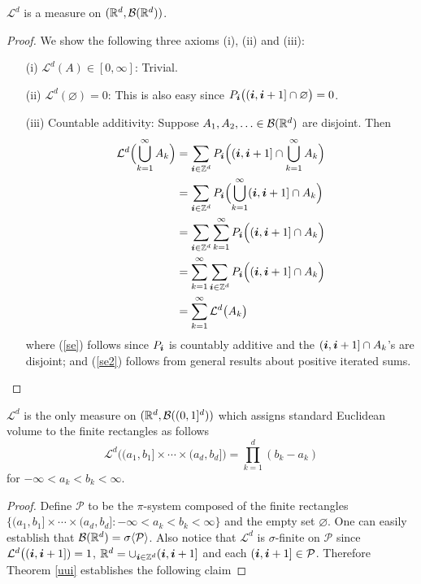 \begin{theorem}
 $\mathcal L^d$  is a measure on $(\Bbb R^d,\mathcal B(\Bbb R^d))$.
\end{theorem}
\begin{proof}
We show the following three axioms (i), (ii) and (iii):
\begin{enumerate}
\item[(i)] $\mathcal L^d(A)\in [0,\infty]$: Trivial.
 \item[(ii)]  $\mathcal L^d(\varnothing)=0$: This is also easy since $P_{\boldsymbol i}\bigl( (\boldsymbol i, \boldsymbol i+1]\cap \varnothing\bigr)=0$.
\item[(iii)] Countable additivity: Suppose $A_1,A_2,\ldots\in\mathcal B(\Bbb R^d)$ are disjoint. Then
\begin{align}
\mathcal L^d\Bigl (\bigcup_{k=1}^\infty A_k\Bigr)&=\sum_{\boldsymbol i\in\Bbb Z^d} P_{\boldsymbol i}\Bigl((\boldsymbol i, \boldsymbol i+1] \cap \bigcup_{k=1}^\infty A_k \Bigr) \nonumber\\
&=\sum_{\boldsymbol i\in\Bbb Z^d} P_{\boldsymbol i}\Bigl( \bigcup_{k=1}^\infty (\boldsymbol i, \boldsymbol i+1] \cap A_k \Bigr) \nonumber\\
&=\sum_{\boldsymbol i\in\Bbb Z^d} \sum_{k=1}^\infty P_{\boldsymbol i} \Bigl((\boldsymbol i, \boldsymbol i+1] \cap A_k \Bigr)\label{se} \\
&=\sum_{k=1}^\infty  \sum_{\boldsymbol i\in\Bbb Z^d} P_{\boldsymbol i} \Bigl((\boldsymbol i, \boldsymbol i+1] \cap A_k \Bigr)\label{se2} \\
&=\sum_{k=1}^\infty  \mathcal L^d\bigl (A_k \bigr) \nonumber
\end{align}
where (\ref{se}) follows since $P_{\boldsymbol i}$ is countably additive and the $ (\boldsymbol i, \boldsymbol i+1]\cap A_k $'s are disjoint; and (\ref{se2}) follows from general results about positive iterated sums.
\end{enumerate}
\end{proof}



 \begin{theorem}
 \label{ui2}
  $\mathcal L^d$ is the only measure on $(\Bbb R^d,\mathcal B((0,1]^d))$ which assigns standard Euclidean volume to the finite rectangles as follows
 \begin{equation}
\mathcal L^d \bigl( (a_1,b_1]\times \cdots \times (a_d,b_d]\bigr)=\prod_{k=1}^d (b_k - a_k)
\end{equation}
for $-\infty < a_k < b_k <\infty$.
\end{theorem}
\begin{proof}
Define $\mathcal P$ to be the $\pi$-system composed of the finite rectangles $\{ (a_1,b_1]\times \cdots \times (a_d,b_d]: -\infty < a_k < b_k <\infty\}$ and the empty set $\varnothing$. One can easily establish that $\mathcal B(\Bbb R^d)=\sigma\langle\mathcal P\rangle$.
 Also notice that $\mathcal L^d$ is $\sigma$-finite on $\mathcal P$ since  $\mathcal L^d\bigl((\boldsymbol i,\boldsymbol i+1])=1$, $\Bbb R^d = \cup_{\boldsymbol i\in\Bbb Z^d} (\boldsymbol i,\boldsymbol i+1]$ and each $(\boldsymbol i,\boldsymbol i+1]\in \mathcal P$.
 Therefore Theorem \ref{uui} establishes the following claim
\end{proof}




